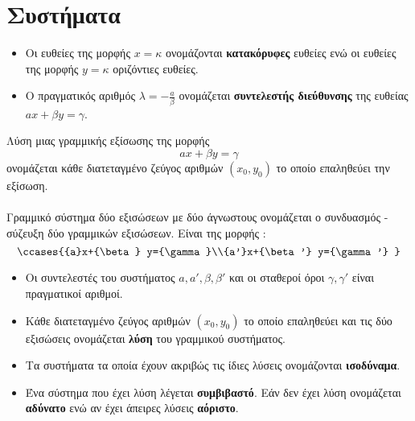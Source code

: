 \documentclass[twoside,nofonts,internet,shmeiwseis]{thewria}
\begin{document}
\section{Συστήματα}
\orismoi
{}
\begin{itemize}[itemsep=0mm]
\item Οι ευθείες της μορφής $ x=\kappa $ ονομάζονται \textbf{κατακόρυφες} ευθείες ενώ οι ευθείες της μορφής $ y=\kappa $ οριζόντιες ευθείες.
\item Ο πραγματικός αριθμός $ \lambda=-\frac{a}{\beta} $ ονομάζεται \textbf{συντελεστής διεύθυνσης} της ευθείας $ ax+\beta y=\gamma $.
\end{itemize}
Λύση μιας γραμμικής εξίσωσης της μορφής \[ ax+\beta y=\gamma \] ονομάζεται κάθε διατεταγμένο ζεύγος αριθμών $ \left( x_0,y_0\right)  $ το οποίο επαληθεύει την εξίσωση.\\\\
Γραμμικό σύστημα δύο εξισώσεων με δύο άγνωστους ονομάζεται ο συνδυασμός - σύζευξη δύο γραμμικών εξισώσεων. Είναι της μορφής :
\[ \ccases{{a}x+{\beta} y={\gamma}\\{a'}x+{\beta'} y={\gamma'} } \]
\begin{itemize}[itemsep=0mm]
\item Οι συντελεστές του συστήματος $ a,a',\beta,\beta' $ και οι σταθεροί όροι $ \gamma,\gamma' $ είναι πραγματικοί αριθμοί.
\item Κάθε διατεταγμένο ζεύγος αριθμών $ \left(x_0,y_0\right)  $ το οποίο επαληθεύει και τις δύο εξισώσεις ονομάζεται \textbf{λύση} του γραμμικού συστήματος.
\item Τα συστήματα τα οποία έχουν ακριβώς τις ίδιες λύσεις ονομάζονται \textbf{ισοδύναμα}.
\item Ένα σύστημα που έχει λύση λέγεται \textbf{συμβιβαστό}. Εάν δεν έχει λύση ονομάζεται \textbf{αδύνατο} ενώ αν έχει άπειρες λύσεις \textbf{αόριστο}.
\end{itemize}
\end{document}
